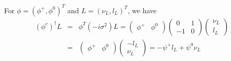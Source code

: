 \documentclass[11pt]{article}
\begin{document}
\section{ }
For $\phi = (\phi^+, \phi^0)^T$ and $L = (\nu_L, l_L)^T$, we have
\begin{eqnarray}
    (\phi^c)^\dagger L & = & \phi^T (-i\sigma^2) L = 
    \begin{pmatrix}
        \phi^+ & \phi^0
    \end{pmatrix}
    \begin{pmatrix}
        0 & 1 \\ -1 & 0
    \end{pmatrix}
    \begin{pmatrix}
        \nu_L \\ l_L
    \end{pmatrix}\\
    &=&
    \begin{pmatrix}
        \phi^+ & \phi^0
    \end{pmatrix}
    \begin{pmatrix}
        -l_L\\\nu_L
    \end{pmatrix}
    = -\psi^+ l_L + \psi^0 \nu_L
\end{eqnarray}
\end{document}
